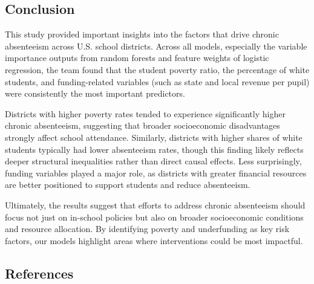 \documentclass[
  11pt,
]{article}
\begin{document}
\subsection{Conclusion}\label{conclusion}

This study provided important insights into the factors that drive
chronic absenteeism across U.S. school districts. Across all models,
especially the variable importance outputs from random forests and
feature weights of logistic regression, the team found that the student
poverty ratio, the percentage of white students, and funding-related
variables (such as state and local revenue per pupil) were consistently
the most important predictors.

Districts with higher poverty rates tended to experience significantly
higher chronic absenteeism, suggesting that broader socioeconomic
disadvantages strongly affect school attendance. Similarly, districts
with higher shares of white students typically had lower absenteeism
rates, though this finding likely reflects deeper structural
inequalities rather than direct causal effects. Less surprisingly,
funding variables played a major role, as districts with greater
financial resources are better positioned to support students and reduce
absenteeism.

Ultimately, the results suggest that efforts to address chronic
absenteeism should focus not just on in-school policies but also on
broader socioeconomic conditions and resource allocation. By identifying
poverty and underfunding as key risk factors, our models highlight areas
where interventions could be most impactful.

\subsection{References}\label{references}
\end{document}
